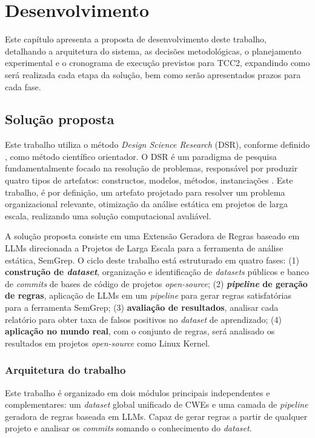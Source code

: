 \documentclass[
    12pt,                %
    openright,           %
    oneside,             %
    a4paper,             %
    english,             %
    brazil               %
]{abntex2}
\begin{document}
\chapter{Desenvolvimento}
\label{cap:desenvolvimento}
\par
Este capítulo apresenta a proposta de desenvolvimento deste trabalho, detalhando a arquitetura do sistema, as decisões metodológicas, o planejamento experimental e o cronograma de execução previstos para TCC2, expandindo como será realizada cada etapa da solução, bem como serão apresentados prazos para cada fase.

\section{Solução proposta}
\label{sec:solucao}
\par
Este trabalho utiliza o método \textit{Design Science Research} (DSR), conforme definido , como método científico orientador.
O DSR é um paradigma de pesquisa fundamentalmente focado na resolução de problemas, responsável por produzir quatro tipos de artefatos: constructos, modelos, métodos, instanciações \cite{hevner2004design}.
Este trabalho, é por definição, um artefato projetado para resolver um problema organizacional relevante, otimização da análise estática em projetos de larga escala, realizando uma solução computacional avaliável.
\par
A solução proposta consiste em uma Extensão Geradora de Regras baseado em LLMs direcionada a Projetos de Larga Escala para a ferramenta de análise estática, SemGrep.
O ciclo deste trabalho está estruturado em quatro fases:
(1) \textbf{construção de \textit{dataset}}, organização e identificação de \textit{datasets} públicos e banco de \textit{commits} de bases de código de projetos \textit{open-source};
(2) \textbf{\textit{pipeline} de geração de regras}, aplicação de LLMs em um \textit{pipeline} para gerar regras satisfatórias para a ferramenta SemGrep;
(3) \textbf{avaliação de resultados}, analisar cada relatório para obter taxa de falsos positivos no \textit{dataset} de aprendizado;
(4) \textbf{aplicação no mundo real}, com o conjunto de regras, será analisado os resultados em projetos \textit{open-source} como Linux Kernel.

\subsection{Arquitetura do trabalho}
\label{sec:arquitetura}
\par
Este trabalho é organizado em dois módulos principais independentes e complementares: um \textit{dataset} global unificado de CWEs e uma camada de \textit{pipeline} geradora de regras baseada em LLMs.
Capaz de gerar regras a partir de qualquer projeto e analisar os \textit{commits} somando o conhecimento do \textit{dataset}.
\par
\end{document}
